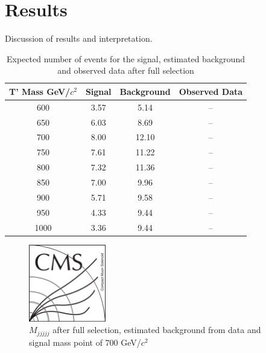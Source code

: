 \section{Results}
\label{sec:res}

Discussion of results and interpretation.

\begin{table}[htbH]
\begin{center}
\begin{tabular}{|c|c|c|c|}
\hline 
T' Mass GeV/$c^{2}$ & Signal & Background & Observed Data\\
\hline 
600 & 3.57 & 5.14 & -- \\
650 & 6.03 & 8.69 & -- \\
700 & 8.00 & 12.10 & -- \\
750 & 7.61 & 11.22 & -- \\
800 & 7.32 & 11.36 & -- \\
850 & 7.00 & 9.96 & -- \\
900 & 5.71 & 9.58 & -- \\
950 & 4.33 & 9.44 & -- \\
1000 & 3.36 & 9.44 & -- \\
\hline
\end{tabular}
\caption{Expected number of events for the signal, estimated
  background and observed data after full selection \label{tab:ExpEvts}
}
\end{center}
\end{table}\clearpage

\begin{figure}[!Hhtbp]
  \begin{center}
    \includegraphics[width=0.3\textwidth]{figs/CMSlogo.png}
    \caption{$M_{jjjjj}$ after full selection, estimated background from data and signal mass point of 700 GeV/$c^{2}$}
    \label{fig:FinalPlot}
  \end{center}
\end{figure}\clearpage

